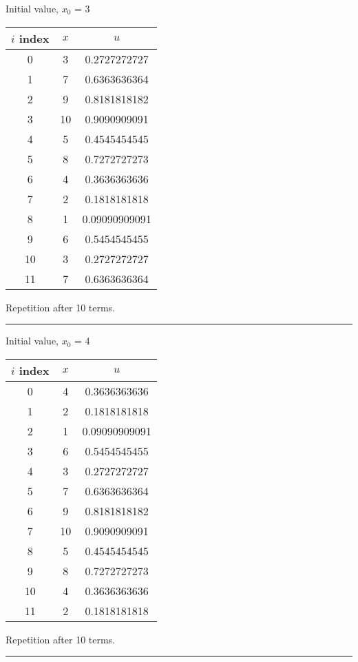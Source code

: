 \documentclass{article}
\begin{document}
Initial value, $x_0$ = 3
\begin{center} \begin{tabular}{||c | c | c||}  \hline
		$i$ index & $x$ & $u$ \\ [0.5ex] \hline \hline0 & 3 & 0.2727272727\\
		\hline 
		1 & 7 & 0.6363636364\\
		\hline 
		2 & 9 & 0.8181818182\\
		\hline 
		3 & 10 & 0.9090909091\\
		\hline 
		4 & 5 & 0.4545454545\\
		\hline 
		5 & 8 & 0.7272727273\\
		\hline 
		6 & 4 & 0.3636363636\\
		\hline 
		7 & 2 & 0.1818181818\\
		\hline 
		8 & 1 & 0.09090909091\\
		\hline 
		9 & 6 & 0.5454545455\\
		\hline 
		10 & 3 & 0.2727272727\\
		\hline 
		11 & 7 & 0.6363636364\\
		\hline 
	\end{tabular} 
\end{center} Repetition after 10 terms.
\\ \noindent\rule[0.5ex]{\linewidth}{1pt}
Initial value, $x_0$ = 4
\begin{center} \begin{tabular}{||c | c | c||}  \hline
		$i$ index & $x$ & $u$ \\ [0.5ex] \hline \hline0 & 4 & 0.3636363636\\
		\hline 
		1 & 2 & 0.1818181818\\
		\hline 
		2 & 1 & 0.09090909091\\
		\hline 
		3 & 6 & 0.5454545455\\
		\hline 
		4 & 3 & 0.2727272727\\
		\hline 
		5 & 7 & 0.6363636364\\
		\hline 
		6 & 9 & 0.8181818182\\
		\hline 
		7 & 10 & 0.9090909091\\
		\hline 
		8 & 5 & 0.4545454545\\
		\hline 
		9 & 8 & 0.7272727273\\
		\hline 
		10 & 4 & 0.3636363636\\
		\hline 
		11 & 2 & 0.1818181818\\
		\hline 
	\end{tabular} 
\end{center} Repetition after 10 terms.
\\ \noindent\rule[0.5ex]{\linewidth}{1pt}
\pagebreak
\end{document}
